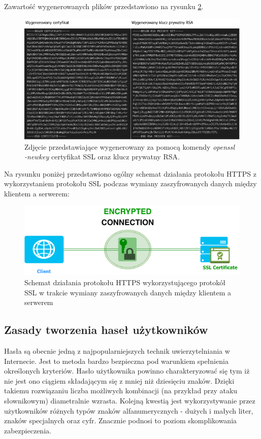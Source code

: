 \newpage
Zawartość wygenerowanych plików przedstawiono na rysunku \ref{Rys:keyandpem}.

\begin{figure}[h]
	\centering\includegraphics[scale=0.6]{images/security/key_and_certificate.png}
	\caption{Zdjęcie przedstawiające wygenerowany za pomocą komendy \textit{openssl -newkey} certyfikat SSL oraz klucz prywatny RSA.}
	\label{Rys:keyandpem}
\end{figure}

Na rysunku poniżej przedstawiono ogólny schemat działania protokołu HTTPS z wykorzystaniem protokołu SSL podczas wymiany zaszyfrowanych danych między klientem a serwerem:

\begin{figure}[h]
	\centering\includegraphics[scale=0.6]{images/security/how-https-works.png}
	\caption{Schemat działania protokołu HTTPS wykorzystującego protokół SSL w trakcie wymiany zaszyfrowanych danych między klientem a serwerem}
	\label{Rys:keyandpem}
\end{figure}

\subsection{Zasady tworzenia haseł użytkowników}
Hasła są obecnie jedną z najpopularniejszych technik uwierzytelniania w Internecie. Jest to metoda bardzo bezpieczna pod warunkiem spełnienia określonych kryteriów. Hasło użytkownika powinno charakteryzować się tym iż nie jest ono ciągiem składającym się z mniej niż dziesięciu znaków. Dzięki takiemu rozwiązaniu liczba możliwych kombinacji (na przykład przy ataku słownikowym) diametralnie wzrasta. Kolejną kwestią jest wykorzystywanie przez użytkowników różnych typów znaków alfanumerycznych - dużych i małych liter, znaków specjalnych oraz cyfr. Znacznie podnosi to poziom skomplikowania zabezpieczenia. 

